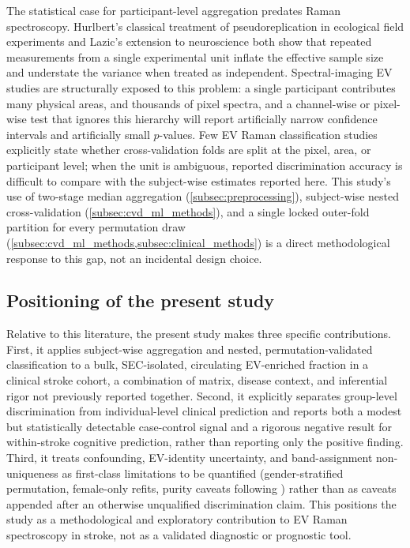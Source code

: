 \documentclass[preprint,12pt]{elsarticle}
\begin{document}
The statistical case for participant-level aggregation predates Raman spectroscopy. Hurlbert's classical treatment of pseudoreplication in ecological field experiments \cite{hurlbert1984} and Lazic's extension to neuroscience \cite{lazic2010} both show that repeated measurements from a single experimental unit inflate the effective sample size and understate the variance when treated as independent. Spectral-imaging EV studies are structurally exposed to this problem: a single participant contributes many physical areas, and thousands of pixel spectra, and a channel-wise or pixel-wise test that ignores this hierarchy will report artificially narrow confidence intervals and artificially small $p$-values. Few EV Raman classification studies explicitly state whether cross-validation folds are split at the pixel, area, or participant level; when the unit is ambiguous, reported discrimination accuracy is difficult to compare with the subject-wise estimates reported here. This study's use of two-stage median aggregation (\cref{subsec:preprocessing}), subject-wise nested cross-validation (\cref{subsec:cvd_ml_methods}), and a single locked outer-fold partition for every permutation draw (\cref{subsec:cvd_ml_methods,subsec:clinical_methods}) is a direct methodological response to this gap, not an incidental design choice.

\subsection{Positioning of the present study} 
\label{subsec:related_positioning}

Relative to this literature, the present study makes three specific contributions. First, it applies subject-wise aggregation and nested, permutation-validated classification to a bulk, SEC-isolated, circulating EV-enriched fraction in a clinical stroke cohort, a combination of matrix, disease context, and inferential rigor not previously reported together. Second, it explicitly separates group-level discrimination from individual-level clinical prediction and reports both a modest but statistically detectable case-control signal and a rigorous negative result for within-stroke cognitive prediction, rather than reporting only the positive finding. Third, it treats confounding, EV-identity uncertainty, and band-assignment non-uniqueness as first-class limitations to be quantified (gender-stratified permutation, female-only refits, purity caveats following \cite{gualerzi2019,koster2021}) rather than as caveats appended after an otherwise unqualified discrimination claim. This positions the study as a methodological and exploratory contribution to EV Raman spectroscopy in stroke, not as a validated diagnostic or prognostic tool.
\color{black}
\end{document}
